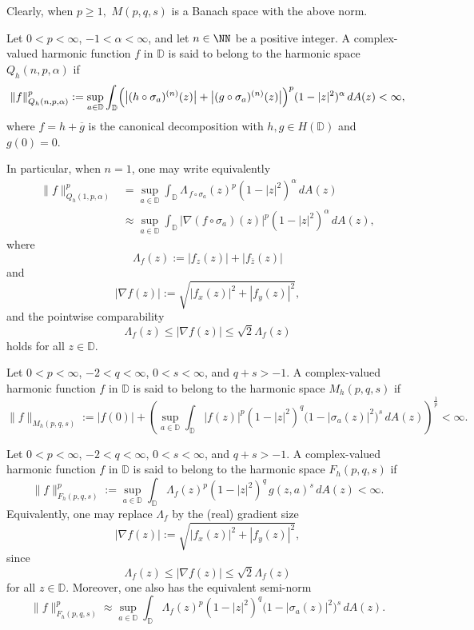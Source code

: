 \documentclass[12pt, reqno]{amsart}
\begin{document}
Clearly, when $p\ge 1,$ $M(p,q,s)$  is a Banach space with the above norm.

\begin{definition}\label{def:Qh-npa}
{\rm Let $0<p<\infty$, $-1<\alpha<\infty$, and let $n\in\NN$ be a positive integer.
A complex-valued harmonic function $f$ in $\mathbb D$ is said to belong to the harmonic space $Q_h(n,p,\alpha)$ if
\[
\|f\|_{Q_h(n,p,\alpha)}^{p}
:=\sup_{a\in\mathbb D}\int_{\mathbb D}\Bigl(\bigl|(h\circ\sigma_a)^{(n)}(z)\bigr|+\bigl|(g\circ\sigma_a)^{(n)}(z)\bigr|\Bigr)^{p}
(1-|z|^{2})^{\alpha}\,dA(z)<\infty,
\]
where $f=h+\overline g$ is the canonical decomposition with $h,g\in H(\mathbb D)$ and $g(0)=0.$

In particular, when $n=1$, one may write equivalently
\begin{align*}
\|f\|_{Q_h(1,p,\alpha)}^{p}
&=\sup_{a\in\mathbb D}\int_{\mathbb D}\Lambda_{\,f\circ\sigma_a}(z)^{p}(1-|z|^{2})^{\alpha}\,dA(z)\\
&\approx\sup_{a\in\mathbb D}\int_{\mathbb D}\bigl|\nabla(f\circ\sigma_a)(z)\bigr|^{p}(1-|z|^{2})^{\alpha}\,dA(z),
\end{align*}
where $$\Lambda_f(z):=|f_z(z)|+|f_{\bar z}(z)|$$ and $$|\nabla f(z)|:=\sqrt{|f_x(z)|^2+|f_y(z)|^2},$$
and the pointwise comparability $$\Lambda_f(z)\le |\nabla f(z)|\leq\sqrt2\Lambda_f(z)$$ holds for all $z\in\mathbb D$.}
\end{definition}

\begin{definition}\label{def:Mh-pqs}
{\rm Let $0<p<\infty$, $-2<q<\infty$, $0<s<\infty$, and $q+s>-1$.
A complex-valued harmonic function $f$ in $\mathbb D$ is said to belong to the harmonic space $M_h(p,q,s)$ if
\[
\|f\|_{M_h(p,q,s)}
:=|f(0)|+\left(\sup_{a\in\mathbb D}\int_{\mathbb D}|f(z)|^{p}(1-|z|^{2})^{q}\bigl(1-|\sigma_a(z)|^{2}\bigr)^{s}\,dA(z)\right)^{\frac1p}<\infty.
\]}
\end{definition}

\begin{definition}\label{def:Fh-pqs}
{\rm Let $0<p<\infty$, $-2<q<\infty$, $0<s<\infty$, and $q+s>-1$.
A complex-valued harmonic function $f$ in $\mathbb D$ is said to belong to the harmonic space $F_h(p,q,s)$ if
\[
\|f\|_{F_h(p,q,s)}^{p}
:=\sup_{a\in\mathbb D}\int_{\mathbb D}\Lambda_f(z)^{p}(1-|z|^{2})^{q}\,g(z,a)^{s}\,dA(z)<\infty.
\]
Equivalently, one may replace $\Lambda_f$ by the (real) gradient size
\[
|\nabla f(z)|:=\sqrt{|f_x(z)|^2+|f_y(z)|^2},
\]
since $$\Lambda_f(z)\leq|\nabla f(z)|\leq\sqrt2\Lambda_f(z)$$ for all $z\in\mathbb D$. Moreover, one also has the equivalent semi-norm
\[
\|f\|_{F_h(p,q,s)}^{p}\approx
\sup_{a\in\mathbb D}\int_{\mathbb D}\Lambda_f(z)^{p}(1-|z|^{2})^{q}\bigl(1-|\sigma_a(z)|^{2}\bigr)^{s}\,dA(z).
\]}
\end{definition}
\end{document}
